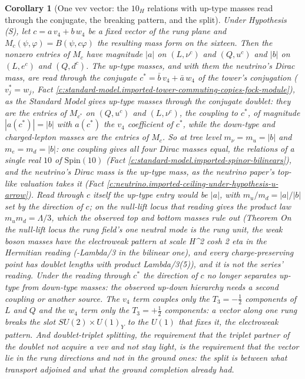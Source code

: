 \documentclass[11pt]{article}
\newtheorem{corollary}[theorem]{Corollary}
\theoremstyle{definition}
\theoremstyle{plain}
\newcommand{\changedmark}[2]{\marginpar{\raggedright\scriptsize\color{#1}#2}}
\begin{document}
\begin{corollary}[One vev vector: the $10_{H}$ relations with up-type masses read through the conjugate, the breaking pattern, and the split]\label{c:standard-model.one-vev-vector-relations-breaking-pattern}
\changedmark{BurntOrange}{changed since the deposit}
Under Hypothesis (S), let $c = a\,v_{4} + b\,w_{4}$ be a fixed vector of the rung plane and $M_{c}(\psi, \varphi) = B(\psi, c\varphi)$ the resulting mass form on the sixteen. Then the nonzero entries of $M_{c}$ have magnitude $|a|$ on $(L, \nu^{c})$ and $(Q, u^{c})$ and $|b|$ on $(L, e^{c})$ and $(Q, d^{c})$. The up-type masses, and with them the neutrino's Dirac mass, are read through the conjugate $c^{*} = \bar{b}\,v_{4} + \bar{a}\,w_{4}$ of the tower's conjugation ($v_{j}^{*} = w_{j}$, Fact \ref{c:standard-model.imported-tower-commuting-copies-fock-module}), as the Standard Model gives up-type masses through the conjugate doublet: they are the entries of $M_{c^{*}}$ on $(Q, u^{c})$ and $(L, \nu^{c})$, the coupling to $c^{*}$, of magnitude $|a(c^{*})| = |b|$ with $a(c^{*})$ the $v_{4}$ coefficient of $c^{*}$, while the down-type and charged-lepton masses are the entries of $M_{c}$. So at tree level $m_{\nu} = m_{u} = |b|$ and $m_{e} = m_{d} = |b|$: one coupling gives all four Dirac masses equal, the relations of a single real $10$ of $\mathrm{Spin}(10)$ (Fact \ref{c:standard-model.imported-spinor-bilinears}), and the neutrino's Dirac mass is the up-type mass, as the neutrino paper's top-like valuation takes it (Fact \ref{c:neutrino.imported-ceiling-under-hypothesis-u-arrow}). Read through $c$ itself the up-type entry would be $|a|$, with $m_{u}/m_{d} = |a|/|b|$ set by the direction of $c$; on the null-lift locus that reading gives the product law $m_{u}m_{d} = \Lambda/3$, which the observed top and bottom masses rule out (Theorem \emph{On the null-lift locus the rung field's one neutral mode is the rung unit, the weak boson masses have the electroweak pattern at scale H\^{}2 cosh 2 eta in the Hermitian reading (-Lambda/3 in the bilinear one), and every charge-preserving point has doublet lengths with product Lambda/3}(5)), and it is not the series' reading. Under the reading through $c^{*}$ the direction of $c$ no longer separates up-type from down-type masses: the observed up-down hierarchy needs a second coupling or another source. The $v_{4}$ term couples only the $T_{3} = -\tfrac12$ components of $L$ and $Q$ and the $w_{4}$ term only the $T_{3} = +\tfrac12$ components: a vector along one rung breaks the slot $SU(2) \times U(1)_{Y}$ to the $U(1)$ that fixes it, the electroweak pattern. And doublet-triplet splitting, the requirement that the triplet partner of the doublet not acquire a vev and not stay light, is the requirement that the vector lie in the rung directions and not in the ground ones: the split is between what transport adjoined and what the ground completion already had.
\end{corollary}
\end{document}
